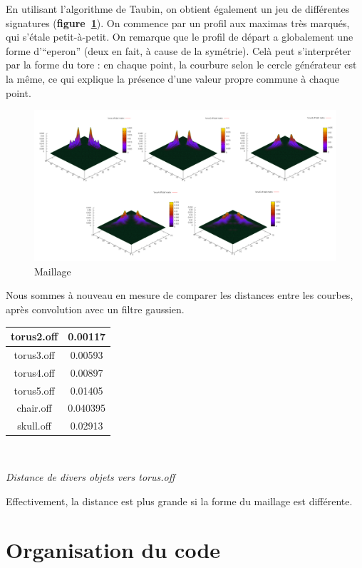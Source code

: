 \documentclass{llncs}
\begin{document}
En utilisant l'algorithme de Taubin, on obtient également un jeu de différentes signatures (\textbf{figure~\ref{tore_taubin}}). On commence par un profil aux maximas très marqués, qui s'étale petit-à-petit. On remarque que le profil de départ a globalement une forme d'``eperon'' (deux en fait, à cause de la symétrie). Celà peut s'interpréter par la forme du tore : en chaque point, la courbure selon le cercle générateur est la même, ce qui explique la présence d'une valeur propre commune à chaque point.

\begin{figure}
\center
\includegraphics[width=12cm]{img/tores_taubin.png}
\caption{Maillage}
\label{tore_taubin}
\end{figure}

Nous sommes à nouveau en mesure de comparer les distances entre les courbes, après convolution avec un filtre gaussien.

\begin{center}
\begin{tabular}{|c|c|}
\hline torus2.off & 0.00117 \\ 
\hline torus3.off & 0.00593 \\ 
\hline torus4.off & 0.00897 \\ 
\hline torus5.off & 0.01405 \\ 
\hline chair.off & 0.040395 \\ 
\hline skull.off & 0.02913 \\ 
\hline 
\end{tabular} \\
\begin{small}
\textit{Distance de divers objets vers torus.off}
\end{small}
\end{center}

Effectivement, la distance est plus grande si la forme du maillage est différente.

\section{Organisation du code}
\end{document}

